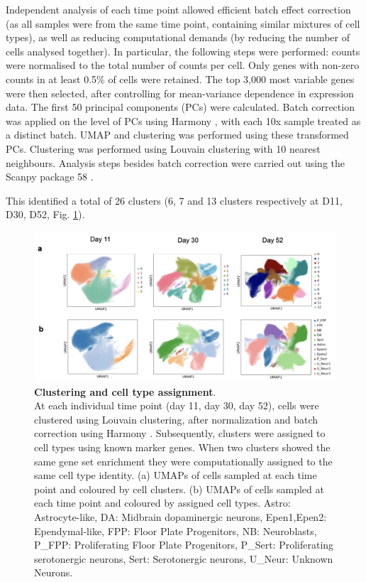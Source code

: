 Independent analysis of each time point allowed efficient batch effect correction (as all samples were from the same time point, containing similar mixtures of cell types), as well as reducing computational demands (by reducing the number of cells analysed together).
In particular, the following steps were performed: counts were normalised to the total number of counts per cell. 
Only genes with non-zero counts in at least 0.5\% of cells were retained. 
The top 3,000 most variable genes were then selected, after controlling for mean-variance dependence in expression data. 
The first 50 principal components (PCs) were calculated. 
Batch correction was applied on the level of PCs using Harmony \cite{korsunsky2019fast}, with each 10x sample treated as a distinct batch. 
UMAP and clustering was performed using these transformed PCs. 
Clustering was performed using Louvain clustering \cite{blondel2008fast} with 10 nearest neighbours. 
Analysis steps besides batch correction were carried out using the Scanpy package 58 \cite{wolf2018scanpy}. 

This identified a total of 26 clusters (6, 7 and 13 clusters respectively at D11, D30, D52, Fig. \ref{fig:neuroseq_clusters}). 

\begin{figure}[h]
\centering
\includegraphics[width=16cm]{Chapter5/Fig/neuroseq_clusters_celltypes.png}
\caption[Clustering and cell type assignment]{\textbf{Clustering and cell type assignment}.\\
At each individual time point (day 11, day 30, day 52), cells were clustered using Louvain clustering, after normalization and batch correction using Harmony \cite{korsunsky2019fast}.
Subsequently, clusters were assigned to cell types using known marker genes. 
When two clusters showed the same gene set enrichment they were computationally assigned to the same cell type identity. 
(a) UMAPs of cells sampled at each time point and coloured by cell clusters. 
(b) UMAPs of cells sampled at each time point and coloured by assigned cell types.
Astro: Astrocyte-like, DA: Midbrain dopaminergic neurons, Epen1,Epen2: Ependymal-like, FPP: Floor Plate Progenitors, NB: Neuroblasts, P\_FPP: Proliferating Floor Plate Progenitors, P\_Sert: Proliferating serotonergic neurons, Sert: Serotonergic neurons, U\_Neur: Unknown Neurons.}
\label{fig:neuroseq_clusters}
\end{figure}

